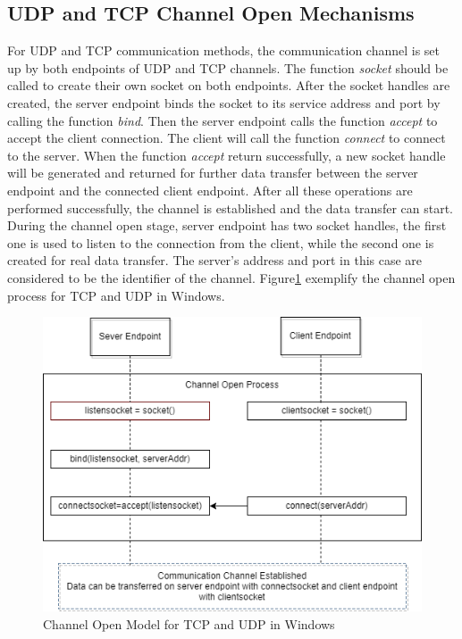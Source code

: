 \subsection{UDP and TCP Channel Open Mechanisms} 
For UDP and TCP communication methods, the communication channel is set up by both endpoints of UDP and TCP channels. The function \textit{socket} should be called to create their own socket on both endpoints. After the socket handles are created, the server endpoint binds the socket to its service address and port by calling the function \textit{bind}. Then the server endpoint calls the function  \textit{accept} to accept the client connection. The client will call the function \textit{connect} to connect to the server. When the function \textit{accept} return successfully, a new socket handle will be generated and returned for further data transfer between the server endpoint and  the connected client endpoint. After all these operations are performed successfully, the channel is established and the data transfer can start. During the channel open stage, server endpoint has two socket handles, the first one is used to listen to the connection from the client, while the second one is created for real data transfer. The server's address and port in this case are considered to be the identifier of the channel. Figure\ref{channelopen2} exemplify the channel open process for TCP and UDP  in Windows.
    
\begin{figure}[H]
\centerline{\includegraphics[scale=0.6]{Figures/tcpudpchannelopen}}
 \caption{Channel Open Model for TCP and UDP in Windows}
\label{channelopen2}    
\end{figure}

